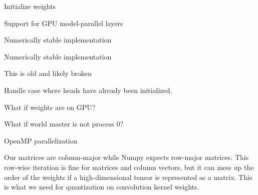 \begin{DoxyRefList}
Initialize weights  
\item[\label{todo__todo000006}%
\Hypertarget{todo__todo000006}%
Member \hyperlink{namespacelbann_1_1proto_a7e4b0a66836712b1713ae4a121453cde}{lbann\+:\+:proto\+:\+:construct\+\_\+layer} (\hyperlink{classlbann_1_1lbann__comm}{lbann\+\_\+comm} $\ast$comm, std\+::map$<$ execution\+\_\+mode, generic\+\_\+data\+\_\+reader $\ast$$>$ \&data\+\_\+readers, int num\+\_\+parallel\+\_\+readers, \hyperlink{classlbann_1_1cudnn_1_1cudnn__manager}{cudnn\+::cudnn\+\_\+manager} $\ast$cudnn, const lbann\+\_\+data\+::\+Layer \&proto\+\_\+layer)]Support for G\+PU model-\/parallel layers  
\item[\label{todo__todo000010}%
\Hypertarget{todo__todo000010}%
Member \hyperlink{namespacelbann_a9b1fd2f864f421aa0bd9f8582ad87c14}{lbann\+:\+:rowwise\+\_\+mean\+\_\+and\+\_\+stdev} (const Abs\+Dist\+Mat \&data, Abs\+Dist\+Mat \&means, Abs\+Dist\+Mat \&stdevs)]Numerically stable implementation  
\item[\label{todo__todo000009}%
\Hypertarget{todo__todo000009}%
Member \hyperlink{namespacelbann_a6b342b3e5b3fbb08b97b6d90aa68d121}{lbann\+:\+:rowwise\+\_\+sums\+\_\+and\+\_\+sqsums} (const Abs\+Dist\+Mat \&data, Abs\+Dist\+Mat \&sums, Abs\+Dist\+Mat \&sqsums)]Numerically stable implementation  
\item[\label{todo__todo000027}%
\Hypertarget{todo__todo000027}%
Member \hyperlink{classlbann_1_1sequential__model_aa405c653dae867e862475e13b9df1db0}{lbann\+:\+:sequential\+\_\+model\+:\+:load\+\_\+from\+\_\+checkpoint} (int fd, const char $\ast$filename, size\+\_\+t $\ast$bytes)]This is old and likely broken  
\item[\label{todo__todo000003}%
\Hypertarget{todo__todo000003}%
Member \hyperlink{classlbann_1_1siamese__model_a7ff41cffb060500605124959f1a2a6cf}{lbann\+:\+:siamese\+\_\+model\+:\+:setup\+\_\+layer\+\_\+topology} () override]Handle case where heads have already been initialized.  
\item[\label{todo__todo000011}%
\Hypertarget{todo__todo000011}%
Member \hyperlink{classlbann_1_1weights_a1a2631987f38d32a90fbee61053a04cc}{lbann\+:\+:weights\+:\+:write\+\_\+proto} (lbann\+\_\+data\+::\+Weights\+Data $\ast$proto) const]What if weights are on G\+PU? 

What if world master is not process 0? 

Open\+MP parallelization 

Our matrices are column-\/major while Numpy expects row-\/major matrices. This row-\/wise iteration is fine for matrices and column vectors, but it can mess up the order of the weights if a high-\/dimensional tensor is represented as a matrix. This is what we need for quantization on convolution kernel weights. 
\end{DoxyRefList}
